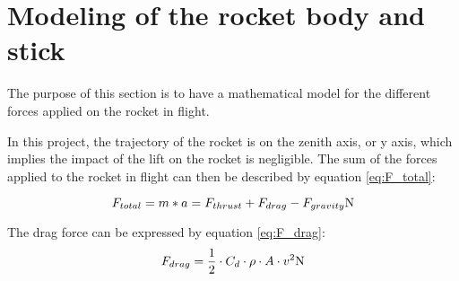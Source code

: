 %			
%			
		
		\section{Modeling of the rocket body and stick}
			
		The purpose of this section is to have a mathematical model for the different forces applied on the rocket in flight. 
		
		In this project, the trajectory of the rocket is on the zenith axis, or y axis, which implies the impact of the lift on the rocket is negligible. The sum of the forces applied to the rocket in flight can then be described by equation \eqref{eq:F_total}:
		
		\begin{equation}
		F_{total} = m*a = F_{thrust} + F_{drag} - F_{gravity} \si{\newton} \label{eq:F_{total}}
		\end{equation}
		\startexplain
		\stopexplain
		
		The drag force can be expressed by equation \eqref{eq:F_drag}:
		\begin{equation}
		F_{drag} = \frac{1}{2} \cdot C_{d} \cdot \rho \cdot A \cdot v^2 \si{\newton} \label{eq:F_{drag}}
		\end{equation}
		\startexplain
		\stopexplain
			
